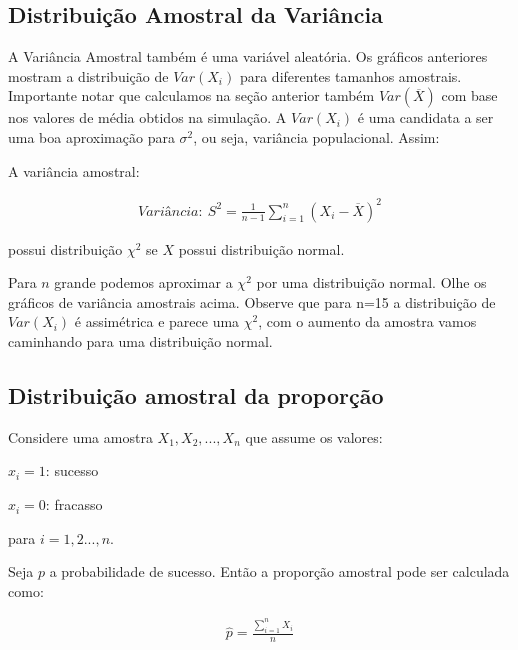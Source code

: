 \documentclass[
  letterpaper,
  DIV=11,
  numbers=noendperiod]{scrartcl}
\begin{document}
\subsection{Distribuição Amostral da
Variância}\label{distribuiuxe7uxe3o-amostral-da-variuxe2ncia}

A Variância Amostral também é uma variável aleatória. Os gráficos
anteriores mostram a distribuição de \(Var(X_i)\) para diferentes
tamanhos amostrais. Importante notar que calculamos na seção anterior
também \(Var(\overline{X})\) com base nos valores de média obtidos na
simulação. A \(Var(X_i)\) é uma candidata a ser uma boa aproximação para
\(\sigma^2\), ou seja, variância populacional. Assim:\\

\begin{definicao}

A variância amostral:

\[\begin{array}{ccc}
Variância: \ S^{2}= \frac{1}{n-1} \sum_{i=1}^{n} (X_i - \overline{X})^{2}
\end{array}\]

possui distribuição \(\chi ^{2}\) se \(X\) possui distribuição normal.

\end{definicao}

Para \(n\) grande podemos aproximar a \(\chi ^{2}\) por uma distribuição
normal. Olhe os gráficos de variância amostrais acima. Observe que para
n=15 a distribuição de \(Var(X_i)\) é assimétrica e parece uma
\(\chi ^{2}\), com o aumento da amostra vamos caminhando para uma
distribuição normal.

\subsection{Distribuição amostral da
proporção}\label{distribuiuxe7uxe3o-amostral-da-proporuxe7uxe3o}

Considere uma amostra \(X_1, X_2, ..., X_{n}\) que assume os valores:

\(x_i=1\): sucesso

\(x_i=0\): fracasso

para \(i=1,2...,n\).

Seja \(p\) a probabilidade de sucesso. Então a proporção amostral pode
ser calculada como:

\[\begin{array}{ccc}
 \hat{p}= \frac{\sum_{i=1}^{n} X_i}{n} 
\end{array}\]
\end{document}
